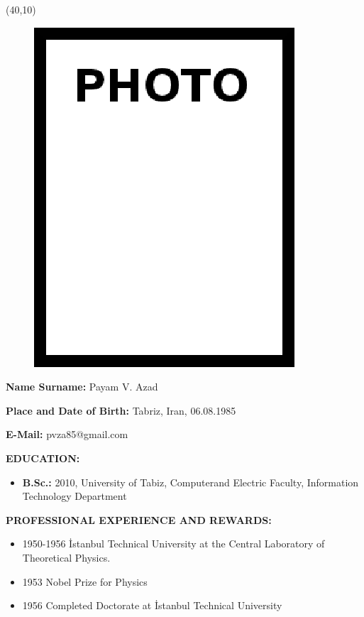 \vspace{10mm}

\newsavebox{\mysquare}
\savebox{\mysquare}{\textcolor{black}{\rule[2.3pt]{3.4pt}{3.4pt}}}

\setlength{\TPHorizModule}{10pt}
\setlength{\TPVertModule}{10pt}
\begin{textblock}{1}(40,10)
 \begin{figure}[p]
 \includegraphics[scale=0.3,keepaspectratio=true]{./fig/photo}
\end{figure}

\end{textblock}
\textbf{Name Surname:} Payam V. Azad

\vspace{-3mm}
\textbf{Place and Date of Birth:} Tabriz, Iran, 06.08.1985

\vspace{-3mm}
\textbf{E-Mail:} pvza85@gmail.com


\textbf{EDUCATION:} 
\vspace{-3mm}
\begin{itemize}
  \item \textbf{B.Sc.:} 2010, University of Tabiz, Computerand Electric Faculty, Information Technology Department
\end{itemize}

\textbf{PROFESSIONAL EXPERIENCE AND REWARDS:}   
\vspace{-3mm}
\begin{itemize}
  \item 1950-1956 İstanbul Technical University at the Central Laboratory of Theoretical Physics.
  \item 1953 Nobel Prize for Physics
  \item 1956 Completed Doctorate at İstanbul Technical University
\end{itemize}

